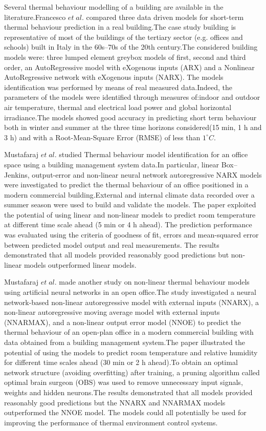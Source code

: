 \documentclass[a4paper,12pt]{article}
\numberwithin{equation}{section}
\begin{document}
Several thermal behaviour modelling of a building are available in the literature.Francesco $et\; al.$  compared  three data driven models for short-term thermal behaviour prediction in a real building.The case study building is representative of most of the buildings of the tertiary sector (e.g. offices and schools) built in Italy in the 60s–70s of the 20th century.The considered building models were: three lumped element greybox models of first, second and third order, an AutoRegressive model with eXogenous inputs (ARX) and a Nonlinear AutoRegressive network with eXogenous inputs (NARX). The models identification was performed by means of real measured data.Indeed, the parameters of the models were identified through measures of:indoor and outdoor air temperature, thermal and electrical load power and global horizontal irradiance.The models showed good accuracy in predicting short term behaviour both in winter and summer at the three time horizons considered(15 min, 1 h and 3 h) and with a Root-Mean-Square Error (RMSE) of less than $1^{\circ} C$.

Mustafaraj $et\; al.$ studied Thermal behaviour model identification for an office space
using a building management system data.In particular, linear Box–Jenkins, output-error and non-linear neural network autoregressive NARX models were investigated to predict the thermal behaviour of an office positioned in a modern commercial building.External and internal climate data recorded over a summer season were used to build and validate the models. The paper exploited the potential of using linear and non-linear models to predict room temperature at different time scale ahead (5 min or 4 h ahead). The prediction performance was evaluated using the criteria of goodness of fit, errors and mean-squared error between predicted model output and real measurements. The results demonstrated that all models provided reasonably good predictions but non-linear models outperformed linear models.

Mustafaraj $et\; al.$ made another study on non-linear thermal behaviour models using artificial neural networks in  an open office.The study investigated a neural network-based non-linear autoregressive model with external inputs (NNARX), a non-linear autoregressive moving average model with external inputs (NNARMAX), and a non-linear output error model (NNOE) to predict the thermal behaviour of an open-plan office in a modern commercial building with data obtained from a building management system.The paper illustrated the potential of using the models to predict
room temperature and relative humidity for different time scales ahead (30 min or 2 h
ahead).To obtain an optimal network structure (avoiding overfitting) after training, a pruning algorithm called optimal brain surgeon (OBS) was used to remove unnecessary input signals, weights and hidden neurons.The results demonstrated that all models provided reasonably good predictions but the NNARX and NNARMAX models outperformed the NNOE model. The models could all potentially be used for improving the performance of thermal environment control systems.
\end{document}
